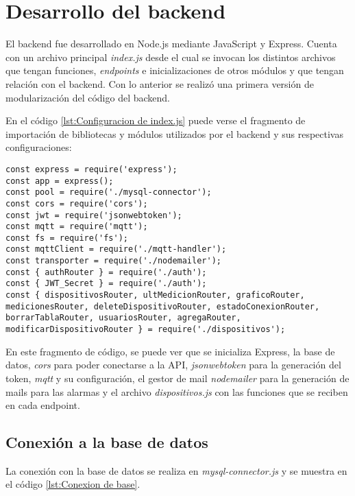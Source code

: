 \section{Desarrollo del backend}

El backend fue desarrollado en Node.js mediante JavaScript y Express. Cuenta con un archivo principal \textit{index.js} desde el cual se invocan los distintos archivos que tengan funciones, \textit{endpoints} e inicializaciones de otros módulos y que tengan relación con el backend. Con lo anterior se realizó una primera versión de modularización del código del backend.

En el código \ref{lst:Configuracion de index.js} puede verse el fragmento de importación de bibliotecas y módulos utilizados por el backend y sus respectivas configuraciones:

\begin{lstlisting}[caption={Configuración de \textit{index.js}.}, label={lst:Configuracion de index.js}]
const express = require('express');
const app = express();
const pool = require('./mysql-connector');
const cors = require('cors');
const jwt = require('jsonwebtoken');
const mqtt = require('mqtt');
const fs = require('fs');
const mqttClient = require('./mqtt-handler');
const transporter = require('./nodemailer');
const { authRouter } = require('./auth');
const { JWT_Secret } = require('./auth');
const { dispositivosRouter, ultMedicionRouter, graficoRouter, medicionesRouter, deleteDispositivoRouter, estadoConexionRouter, borrarTablaRouter, usuariosRouter, agregaRouter, modificarDispositivoRouter } = require('./dispositivos');
\end{lstlisting}

En este fragmento de código, se puede ver que se inicializa Express, la base de datos, \textit{cors} para poder conectarse a la API, \textit{jsonwebtoken} para la generación del token, \textit{mqtt} y su configuración, el gestor de mail \textit{nodemailer} para la generación de mails para las alarmas y el archivo \textit{dispositivos.js} con las funciones que se reciben en cada endpoint.

\subsection{Conexión a la base de datos}

La conexión con la base de datos se realiza en \textit{mysql-connector.js} y se muestra en el código \ref{lst:Conexion de base}.

